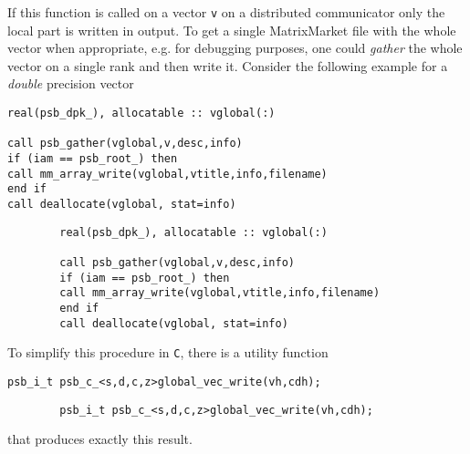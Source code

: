 If this function is called on a vector \lstinline|v| on a distributed communicator
only the local part is written in output. To get a single MatrixMarket file with
the whole vector when appropriate, e.g. for debugging purposes, one could \emph{gather} 
the  whole vector on a single rank and then write it. Consider the following example
for a \emph{double} precision vector
\ifpdf
\begin{verbatim}
real(psb_dpk_), allocatable :: vglobal(:)

call psb_gather(vglobal,v,desc,info)
if (iam == psb_root_) then
call mm_array_write(vglobal,vtitle,info,filename)
end if
call deallocate(vglobal, stat=info)
\end{verbatim}
\else
\begin{center}
	\begin{minipage}[tl]{0.9\textwidth}
		\begin{verbatim} 
		real(psb_dpk_), allocatable :: vglobal(:)
		
		call psb_gather(vglobal,v,desc,info)
		if (iam == psb_root_) then
		call mm_array_write(vglobal,vtitle,info,filename)
		end if
		call deallocate(vglobal, stat=info)
		\end{verbatim}
	\end{minipage}
\end{center}
\fi
To simplify this procedure in \verb|C|, there is a utility function
\ifpdf
\begin{verbatim}
psb_i_t psb_c_<s,d,c,z>global_vec_write(vh,cdh);
\end{verbatim}
\else
\begin{center}
	\begin{minipage}[tl]{0.9\textwidth}
		\begin{verbatim}
		psb_i_t psb_c_<s,d,c,z>global_vec_write(vh,cdh);
		\end{verbatim}
	\end{minipage}
\end{center}
\fi 
that produces exactly this result.

